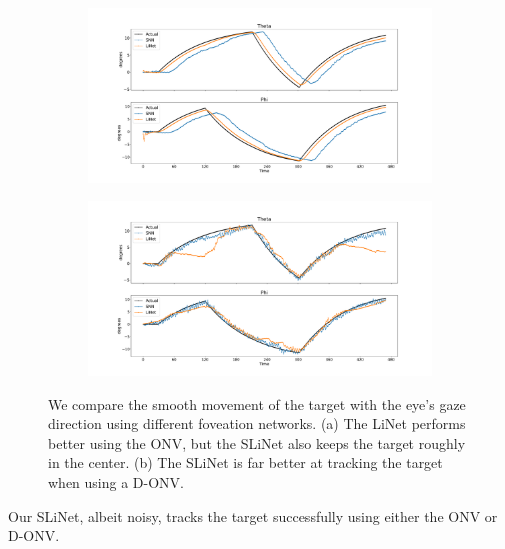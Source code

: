 \documentclass [MS] {UCLAthesis}
\begin{document}
\begin{figure}
    \centering
    \begin{subfigure}{\textwidth}
        \centering
        \includegraphics[width=\textwidth]{smooth_normal}
        \caption{}
        \label{fig:smooth_normal}
    \end{subfigure}
    \begin{subfigure}{\textwidth}
        \centering
        \includegraphics[width=\textwidth]{smooth_delta}
        \caption{}
        \label{fig:smooth_delta}
    \end{subfigure}
    \caption[Smooth pursuit eye displacement with different models]{We compare the smooth movement of the target with the eye's gaze direction using different foveation networks. (a) The LiNet performs better using the ONV, but the SLiNet also keeps the target roughly in the center. (b) The SLiNet is far better at tracking the target when using a D-ONV.}
    \label{fig:smooth}
\end{figure}

Our SLiNet, albeit noisy, tracks the target successfully using either the ONV or D-ONV.

\end{document}
